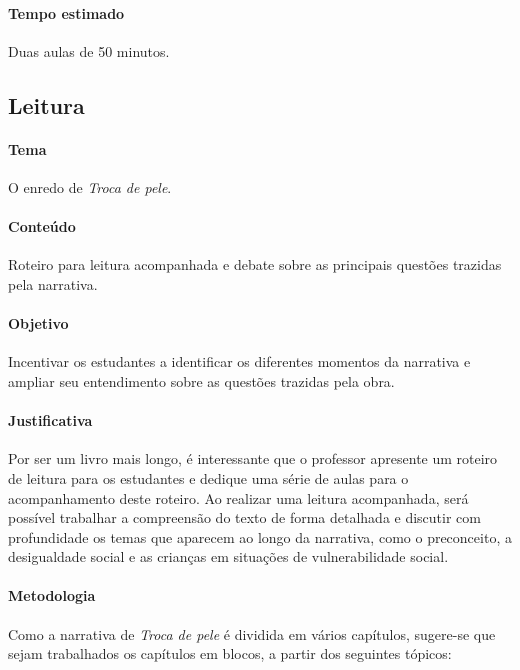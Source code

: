 \documentclass[11pt]{extarticle}
\begin{document}
\paragraph{Tempo estimado} Duas aulas de 50 minutos.

\subsection{Leitura}


\paragraph{Tema} O enredo de \textit{Troca de pele}.

\paragraph{Conteúdo} Roteiro para leitura acompanhada e debate sobre as principais questões trazidas pela narrativa.

\paragraph{Objetivo} Incentivar os estudantes a identificar os diferentes momentos da narrativa e ampliar seu entendimento sobre as questões trazidas pela obra.

\paragraph{Justificativa} Por ser um livro mais longo, é interessante que o professor apresente um roteiro de leitura para os estudantes e dedique uma série de aulas para o acompanhamento deste roteiro. Ao realizar uma leitura acompanhada, será possível trabalhar a compreensão do texto de forma detalhada e discutir com profundidade os temas que aparecem ao longo da narrativa, como o preconceito, a desigualdade social e as crianças em situações de vulnerabilidade social. 

\paragraph{Metodologia} Como a narrativa de \textit{Troca de pele} é dividida em vários capítulos, sugere-se que sejam trabalhados os capítulos em blocos, a partir dos seguintes tópicos:
\end{document}
